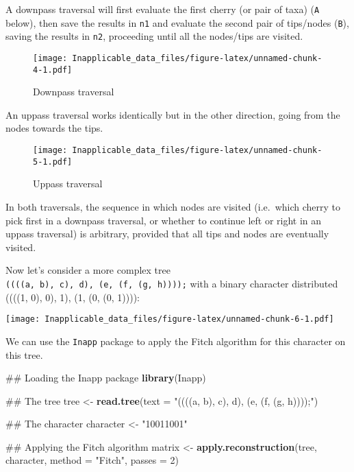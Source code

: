 \documentclass[]{book}
\newenvironment{Shaded}{\begin{snugshade}}{\end{snugshade}}
\newcommand{\KeywordTok}[1]{\textcolor[rgb]{0.13,0.29,0.53}{\textbf{#1}}}
\newcommand{\DataTypeTok}[1]{\textcolor[rgb]{0.13,0.29,0.53}{#1}}
\newcommand{\DecValTok}[1]{\textcolor[rgb]{0.00,0.00,0.81}{#1}}
\newcommand{\StringTok}[1]{\textcolor[rgb]{0.31,0.60,0.02}{#1}}
\newcommand{\NormalTok}[1]{#1}
\theoremstyle{definition}
\theoremstyle{definition}
\theoremstyle{definition}
\theoremstyle{remark}
\begin{document}
A downpass traversal will first evaluate the first cherry (or pair of
taxa) (\texttt{A} below), then save the results in \texttt{n1} and
evaluate the second pair of tips/nodes (\texttt{B}), saving the results
in \texttt{n2}, proceeding until all the nodes/tips are visited.

\begin{figure}
\centering
\texttt{[image: Inapplicable\_data\_files/figure-latex/unnamed-chunk-4-1.pdf]}
\caption{\label{fig:unnamed-chunk-4}Downpass traversal}
\end{figure}

An uppass traversal works identically but in the other direction, going
from the nodes towards the tips.

\begin{figure}
\centering
\texttt{[image: Inapplicable\_data\_files/figure-latex/unnamed-chunk-5-1.pdf]}
\caption{\label{fig:unnamed-chunk-5}Uppass traversal}
\end{figure}

In both traversals, the sequence in which nodes are visited (i.e.~which
cherry to pick first in a downpass traversal, or whether to continue
left or right in an uppass traversal) is arbitrary, provided that all
tips and nodes are eventually visited.

Now let's consider a more complex tree
\texttt{((((a,\ b),\ c),\ d),\ (e,\ (f,\ (g,\ h))));} with a binary
character distributed ((((1, 0), 0), 1), (1, (0, (0, 1)))):

\texttt{[image: Inapplicable\_data\_files/figure-latex/unnamed-chunk-6-1.pdf]}

We can use the \texttt{Inapp} package to apply the Fitch algorithm for
this character on this tree.

\begin{Shaded}
\begin{Highlighting}[]
\NormalTok{## Loading the Inapp package}
\KeywordTok{library}\NormalTok{(Inapp)}

\NormalTok{## The tree}
\NormalTok{tree <-}\StringTok{ }\KeywordTok{read.tree}\NormalTok{(}\DataTypeTok{text =} \StringTok{"((((a, b), c), d), (e, (f, (g, h))));"}\NormalTok{)}

\NormalTok{## The character}
\NormalTok{character <-}\StringTok{ "10011001"}

\NormalTok{## Applying the Fitch algorithm}
\NormalTok{matrix <-}\StringTok{ }\KeywordTok{apply.reconstruction}\NormalTok{(tree, character, }\DataTypeTok{method =} \StringTok{"Fitch"}\NormalTok{, }\DataTypeTok{passes =} \DecValTok{2}\NormalTok{)}
\end{Highlighting}
\end{Shaded}
\end{document}
